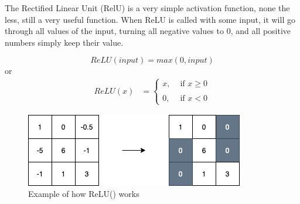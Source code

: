 The Rectified Linear Unit (RelU) is a very simple activation function, none the less, still a very useful function. When ReLU is called with some input, it will go through all values of the input, turning all negative values to 0, and all positive numbers simply keep their value.

$$
ReLU(input) = max(0,input)
$$
or
\begin{align}
  ReLU(x) &=\left\{
  \begin{matrix}
    x, & \text{ if } x \geq 0\\
    \\
    0,  &\text{ if } x < 0
  \end{matrix}
  \right.
\end{align}

\begin{figure}[!ht]
  \centering
  \includegraphics[scale=0.4]{latex/imgs/relu.png}
  \caption{Example of how ReLU() works}\label{Baseline:before}
\end{figure}
